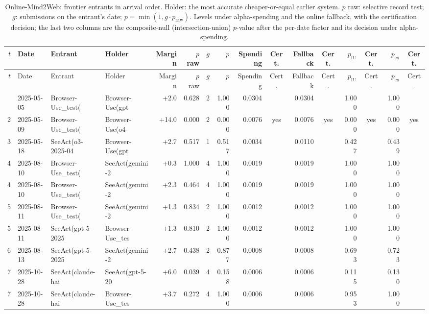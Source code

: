 {\begin{longtable}{rlllrrrrrcrcrcrc}
\caption{Online-Mind2Web: frontier entrants in arrival order. Holder: the most accurate cheaper-or-equal earlier system. $p$ raw: selective record test; $g$: submissions on the entrant's date; $p = \min(1, g \cdot p_{\mathrm{raw}})$. Levels under alpha-spending and the online fallback, with the certification decision; the last two columns are the composite-null (intersection-union) $p$-value after the per-date factor and its decision under alpha-spending.}\label{tab:supp-cert-hal_online_mind2web}\\
\toprule
$t$ & Date & Entrant & Holder & Margin & $p$ raw & $g$ & $p$ & Spending & Cert. & Fallback & Cert. & $p_{\mathrm{IU}}$ & Cert. & $p_{\mathrm{ex}}$ & Cert. \\
\midrule
\endfirsthead
\toprule
$t$ & Date & Entrant & Holder & Margin & $p$ raw & $g$ & $p$ & Spending & Cert. & Fallback & Cert. & $p_{\mathrm{IU}}$ & Cert. & $p_{\mathrm{ex}}$ & Cert. \\
\midrule
\endhead
\bottomrule
\endfoot
1 & 2025-05-05 & Browser-Use\_test(~ & Browser-Use(gpt~ & +2.0 & 0.628 & 2 & 1.000 & 0.0304 &  & 0.0304 &  & 1.000 &  & 1.000 &  \\
2 & 2025-05-09 & Browser-Use\_test(~ & Browser-Use(o4-~ & +14.0 & 0.000 & 2 & 0.000 & 0.0076 & yes & 0.0076 & yes & 0.000 & yes & 0.000 & yes \\
3 & 2025-05-18 & SeeAct(o3-2025-04~ & Browser-Use(gpt~ & +2.7 & 0.517 & 1 & 0.517 & 0.0034 &  & 0.0110 &  & 0.427 &  & 0.439 &  \\
4 & 2025-08-10 & Browser-Use\_test(~ & SeeAct(gemini-2~ & +0.3 & 1.000 & 4 & 1.000 & 0.0019 &  & 0.0019 &  & 1.000 &  & 1.000 &  \\
4 & 2025-08-10 & Browser-Use\_test(~ & SeeAct(gemini-2~ & +2.3 & 0.464 & 4 & 1.000 & 0.0019 &  & 0.0019 &  & 1.000 &  & 1.000 &  \\
5 & 2025-08-11 & Browser-Use\_test(~ & SeeAct(gemini-2~ & +1.3 & 0.834 & 2 & 1.000 & 0.0012 &  & 0.0012 &  & 1.000 &  & 1.000 &  \\
5 & 2025-08-11 & SeeAct(gpt-5-2025~ & Browser-Use\_tes~ & +1.3 & 0.810 & 2 & 1.000 & 0.0012 &  & 0.0012 &  & 1.000 &  & 1.000 &  \\
6 & 2025-08-13 & SeeAct(gpt-5-2025~ & SeeAct(gemini-2~ & +2.7 & 0.438 & 2 & 0.877 & 0.0008 &  & 0.0008 &  & 0.693 &  & 0.723 &  \\
7 & 2025-10-28 & SeeAct(claude-hai~ & SeeAct(gpt-5-20~ & +6.0 & 0.039 & 4 & 0.158 & 0.0006 &  & 0.0006 &  & 0.115 &  & 0.130 &  \\
7 & 2025-10-28 & SeeAct(claude-hai~ & Browser-Use\_tes~ & +3.7 & 0.272 & 4 & 1.000 & 0.0006 &  & 0.0006 &  & 0.953 &  & 1.000 &  \\
\end{longtable}

}
